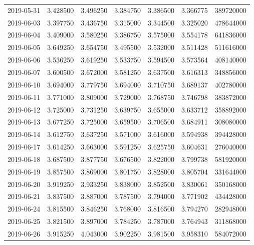 \begin{tabular}{lrrrrrr}
2019-05-31 &    3.428500 &    3.496250 &    3.384750 &    3.386500 &    3.366775 &   389720000 \\
2019-06-03 &    3.397750 &    3.436750 &    3.315000 &    3.344500 &    3.325020 &   478644000 \\
2019-06-04 &    3.409000 &    3.580250 &    3.386750 &    3.575000 &    3.554178 &   641836000 \\
2019-06-05 &    3.649250 &    3.654750 &    3.495500 &    3.532000 &    3.511428 &   511616000 \\
2019-06-06 &    3.536250 &    3.619250 &    3.533750 &    3.594500 &    3.573564 &   408140000 \\
2019-06-07 &    3.600500 &    3.672000 &    3.581250 &    3.637500 &    3.616313 &   348856000 \\
2019-06-10 &    3.694000 &    3.779750 &    3.694000 &    3.710750 &    3.689137 &   402780000 \\
2019-06-11 &    3.771000 &    3.809000 &    3.729000 &    3.768750 &    3.746798 &   383872000 \\
2019-06-12 &    3.725000 &    3.731250 &    3.639750 &    3.655000 &    3.633712 &   358892000 \\
2019-06-13 &    3.677250 &    3.725000 &    3.659500 &    3.706500 &    3.684911 &   308080000 \\
2019-06-14 &    3.612750 &    3.637250 &    3.571000 &    3.616000 &    3.594938 &   394428000 \\
2019-06-17 &    3.614250 &    3.663000 &    3.591250 &    3.625750 &    3.604631 &   276040000 \\
2019-06-18 &    3.687500 &    3.877750 &    3.676500 &    3.822000 &    3.799738 &   581920000 \\
2019-06-19 &    3.857500 &    3.869000 &    3.801750 &    3.828000 &    3.805704 &   331644000 \\
2019-06-20 &    3.919250 &    3.933250 &    3.838000 &    3.852500 &    3.830061 &   350168000 \\
2019-06-21 &    3.837500 &    3.887000 &    3.787500 &    3.794000 &    3.771902 &   434428000 \\
2019-06-24 &    3.815500 &    3.846250 &    3.768000 &    3.816500 &    3.794270 &   282948000 \\
2019-06-25 &    3.821500 &    3.897000 &    3.784250 &    3.787000 &    3.764943 &   311868000 \\
2019-06-26 &    3.915250 &    4.043000 &    3.902250 &    3.981500 &    3.958310 &   584072000 \\

\end{tabular}
